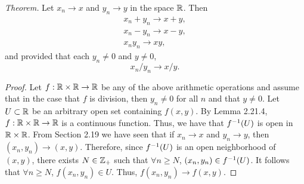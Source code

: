 \begin{exercise}[ID=2.21.5]
  \textit{Theorem.} Let $x_n \rightarrow x$ and $y_n \rightarrow y$ in the space $\mathbb{R}$.
  Then
  \begin{gather*}
    x_n + y_n \rightarrow x + y, \\
      x_n - y_n \rightarrow x - y, \\
      x_n y_n \rightarrow x y,
  \end{gather*}
  and provided that each $y_n \neq 0$ and $y \neq 0$,
  \begin{equation*}
    x_n / y_n \rightarrow x / y.
  \end{equation*}
\end{exercise}
%
\begin{solution}
  \begin{proof}
    Let $f: \mathbb{R} \times \mathbb{R} \rightarrow \mathbb{R}$ be any of the above arithmetic operations and assume that in the case that $f$ is division, then $y_n \neq 0$ for all $n$ and that $y \neq 0$.
    Let $U \subset \mathbb{R}$ be an arbitrary open set containing $f(x, y)$.
    By Lemma 2.21.4, $f: \mathbb{R} \times \mathbb{R} \rightarrow \mathbb{R}$ is a continuous function.
    Thus, we have that $f^{-1}(U)$ is open in $\mathbb{R} \times \mathbb{R}$.
    From Section 2.19 we have seen that if $x_n \rightarrow x$ and $y_n \rightarrow y$, then $(x_n, y_n) \rightarrow (x, y)$.
    Therefore, since $f^{-1}(U)$ is an open neighborhood of $(x, y)$, there exists $N \in \mathbb{Z}_+$ such that $\forall n \geq N$, $(x_n, y_n) \in f^{-1}(U)$.
    It follows that $\forall n \geq N$, $f(x_n, y_n) \in U$.
    Thus, $f(x_n, y_n) \rightarrow f(x, y)$.
  \end{proof}
\end{solution}
\newpage

